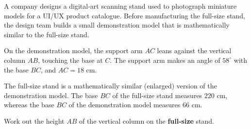 \begin{question}
\noindent A company designs a digital-art scanning stand used to photograph miniature models for a UI/UX product catalogue. Before manufacturing the full-size stand, the design team builds a small demonstration model that is mathematically similar to the full-size stand.

\noindent On the demonstration model, the support arm $AC$ leans against the vertical column $AB$, touching the base at $C$. The support arm makes an angle of $58^\circ$ with the base $BC$, and $AC = 18$ cm.

\begin{center}
\end{center}

\noindent The full-size stand is a mathematically similar (enlarged) version of the demonstration model. The base $BC$ of the full-size stand measures $220$ cm, whereas the base $BC$ of the demonstration model measures $66$ cm.

\noindent Work out the height $AB$ of the vertical column on the \textbf{full-size} stand.

\vspace{6cm}
\begin{flushright}
\end{flushright}
\end{question}
